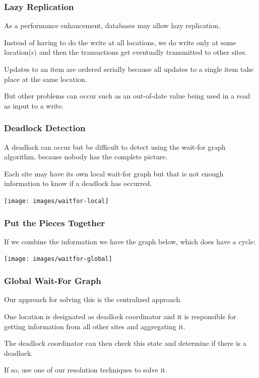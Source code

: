 \begin{frame}
\frametitle{Lazy Replication}
As a performance enhancement, databases may allow lazy replication.

Instead of having to do the write at all locations, we do write only at some location(s) and then the transactions get eventually transmitted to other sites.

Updates to an item are ordered serially because all updates to a single item take place at the same location. 

But other problems can occur such as an out-of-date value being used in a read as input to a write.

\end{frame}

\begin{frame}
\frametitle{Deadlock Detection}

A deadlock can occur but be difficult to detect using the wait-for graph algorithm, because nobody has the complete picture.

Each site may have its own local wait-for graph but that is not enough information to know if a deadlock has occurred.

\begin{center}
\texttt{[image: images/waitfor-local]}
\end{center}

\end{frame}

\begin{frame}
\frametitle{Put the Pieces Together}

If we combine the information we have the graph below, which does have a cycle:

\begin{center}
\texttt{[image: images/waitfor-global]}
\end{center}


\end{frame}

\begin{frame}
\frametitle{Global Wait-For Graph}

Our approach for solving this is the centralized approach.

One location is designated as deadlock coordinator and it is responsible for getting information from all other sites and aggregating it. 

The deadlock coordinator can then check this state and determine if there is a deadlock.

If so, use one of our resolution techniques to solve it.

\end{frame}

